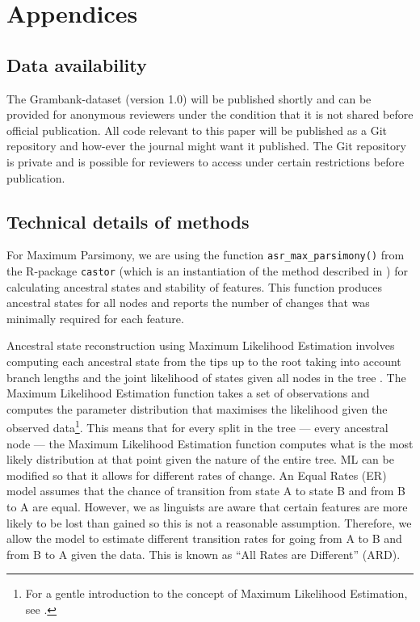 \documentclass[a4paper,10pt]{article} %
\begin{document}
\newpage
\singlespacing
\appendix
\section*{Appendices}
\renewcommand{\thesubsection}{\Alph{subsection}}

\subsection{Data availability}
\label{supp:data_avail}
The Grambank-dataset (version 1.0) will be published shortly and can be provided for anonymous reviewers under the condition that it is not shared before official publication. All code relevant to this paper will be published as a Git repository and how-ever the journal might want it published. The Git repository is private and is possible for reviewers to access under certain restrictions before publication.

\subsection{Technical details of methods}
\label{supp:tech_details}

For Maximum Parsimony, we are using the function \texttt{asr\_max\_parsimony()} from the R-package \texttt{castor} \citep{louca2017efficient} (which is an instantiation of the method described in \citet{sankoff1975minimal}) for calculating ancestral states and stability of features. This function produces ancestral states for all nodes and reports the number of changes that was minimally required for each feature. 

Ancestral state reconstruction using Maximum Likelihood Estimation involves computing each ancestral state from the tips up to the root taking into account branch lengths and the joint likelihood of states given all nodes in the tree \citep{wilks1938large, fisher1912absolute, pagel1994detecting, cunningham1998reconstructing}. The Maximum Likelihood Estimation function takes a set of observations and computes the parameter distribution that maximises the likelihood given the observed data\footnote{For a gentle introduction to the concept of Maximum Likelihood Estimation, see \citet{jonny_ML}.}. This means that for every split in the tree --- every ancestral node --- the Maximum Likelihood Estimation function computes what is the most likely distribution at that point given the nature of the entire tree. ML can be modified so that it allows for different rates of change. An Equal Rates (ER) model assumes that the chance of transition from state A to state B and from B to A are equal. However, we as linguists are aware that certain features are more likely to be lost than gained so this is not a reasonable assumption. Therefore, we allow the model to estimate different transition rates for going from A to B and from B to A given the data. This is known as ``All Rates are Different'' (ARD).
\end{document}
